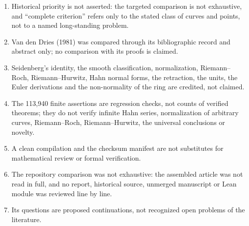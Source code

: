 \documentclass[11pt,oneside]{article}
\numberwithin{equation}{section}
\theoremstyle{definition}
\theoremstyle{remark}
\begin{document}
\begin{enumerate}[leftmargin=*,itemsep=1pt]
stage of it is claimed done.
\item Historical priority is not asserted: the targeted comparison is not exhaustive, and
``complete criterion'' refers only to the stated class of curves and points, not to a
named long-standing problem.
\item Van den Dries (1981) was compared through its bibliographic record and abstract only;
no comparison with its proofs is claimed.
\item Seidenberg's identity, the smooth classification, normalization, Riemann--Roch,
Riemann--Hurwitz, Hahn normal forms, the retraction, the units, the Euler derivations and
the non-normality of the ring are credited, not claimed.
\item The 113,940 finite assertions are regression checks, not counts of verified
theorems; they do not verify infinite Hahn series, normalization of arbitrary curves,
Riemann--Roch, Riemann--Hurwitz, the universal conclusions or novelty.
\item A clean compilation and the checksum manifest are not substitutes for mathematical
review or formal verification.
\item The repository comparison was not exhaustive: the assembled article was not read in
full, and no report, historical source, unmerged manuscript or Lean module was reviewed line
by line.
\item Its questions are proposed continuations, not recognized open problems of the
literature.
\end{enumerate}
\end{document}

